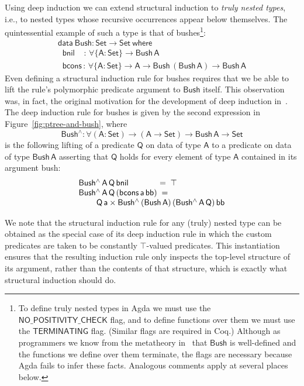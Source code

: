 \documentclass[sigplan,10pt]{acmart}
\begin{document}
Using deep induction we can extend structural induction to {\em truly
  nested types}, i.e., to nested types whose recursive occurrences
appear below themselves. The quintessential example of such a type is
that of bushes\footnote{To define truly nested types in Agda we must
  use the $\mathsf{NO\_POSITIVITY\_CHECK}$ flag, and to define
  functions over them we must use the $\mathsf{TERMINATING}$ flag.
  (Similar flags are required in Coq.) Although as programmers we know
  from the metatheory in~\cite{jp19} that $\mathsf{Bush}$ is
  well-defined and the functions we define over them terminate, the
  flags are necessary because Agda fails to infer these
  facts. Analogous comments apply at several places
  below.}\cite{bm98}:
\begin{equation*}\label{eq:bush}
\begin{array}{l}
\mathsf{data\ Bush : Set \to Set\ where}\\
\mathsf{\;\;bnil\,\,\,\,\,\; :\, \forall \{A : Set\} \to Bush\,A}\\
\mathsf{\;\;bcons\, :\, \forall \{A : Set\} \to A \to Bush\,(Bush\,A) \to Bush\,A} 
\end{array}
\end{equation*}
Even defining a structural induction rule for bushes requires that we
be able to lift the rule's polymorphic predicate argument to
$\mathsf{Bush}$ itself. This observation was, in fact, the original
motivation for the development of deep induction in~\cite{jp20}. The
deep induction rule for bushes is given by the second expression in
Figure~\ref{fig:ptree-and-bush}, where
\[\mathsf{Bush^{\wedge} :
  \forall (A : Set) \to (A \to Set) \to Bush\,A \to Set}\]
is the following lifting of a predicate $\mathsf{Q}$ on data of type
$\mathsf{A}$ to a predicate on data of type $\mathsf{Bush\,A}$
asserting that $\mathsf{Q}$ holds for every element of type
$\mathsf{A}$ contained in its argument bush:
\begin{equation}
\begin{array}{l}
\mathsf{Bush^{\wedge}\,A\,Q\,bnil} \hspace*{0.49in} = \; \mathsf{\top} \\
\mathsf{Bush^{\wedge}\,A\,Q\,(bcons\,a\,bb)} \; = \;\\
\hspace*{0.3in}\mathsf{Q\,a \times Bush^{\wedge}\,(Bush\,A)\,(Bush^{\wedge}\,A\,Q)\,bb} 
\end{array}
\end{equation}

We note that the structural induction rule for any (truly) nested type
can be obtained as the special case of its deep induction rule in
which the custom predicates are taken to be constantly
$\mathsf{\top}$-valued predicates. This instantiation ensures that
the resulting induction rule only inspects the top-level structure of
its argument, rather than the contents of that structure, which is
exactly what structural induction should do.
\end{document}
